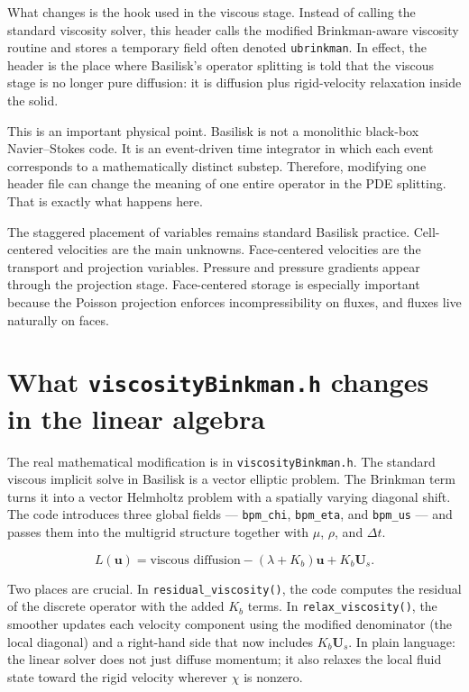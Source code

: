 \documentclass[11pt,a4paper]{article}
\begin{document}
What changes is the hook used in the viscous stage. Instead of calling the standard viscosity solver, this header calls the modified Brinkman-aware viscosity routine and stores a temporary field often denoted \texttt{ubrinkman}. In effect, the header is the place where Basilisk's operator splitting is told that the viscous stage is no longer pure diffusion: it is diffusion plus rigid-velocity relaxation inside the solid.

This is an important physical point. Basilisk is not a monolithic black-box Navier--Stokes code. It is an event-driven time integrator in which each event corresponds to a mathematically distinct substep. Therefore, modifying one header file can change the meaning of one entire operator in the PDE splitting. That is exactly what happens here.

The staggered placement of variables remains standard Basilisk practice. Cell-centered velocities are the main unknowns. Face-centered velocities are the transport and projection variables. Pressure and pressure gradients appear through the projection stage. Face-centered storage is especially important because the Poisson projection enforces incompressibility on fluxes, and fluxes live naturally on faces.

\section{What \texttt{viscosityBinkman.h} changes in the linear algebra}

The real mathematical modification is in \texttt{viscosityBinkman.h}. The standard viscous implicit solve in Basilisk is a vector elliptic problem. The Brinkman term turns it into a vector Helmholtz problem with a spatially varying diagonal shift. The code introduces three global fields --- \texttt{bpm\_chi}, \texttt{bpm\_eta}, and \texttt{bpm\_us} --- and passes them into the multigrid structure together with $\mu$, $\rho$, and $\Delta t$.

\begin{equation}
L(\bm{u}) = \text{viscous diffusion} - (\lambda + K_b)\bm{u} + K_b\bm{U}_s.
\end{equation}

Two places are crucial. In \texttt{residual\_viscosity()}, the code computes the residual of the discrete operator with the added $K_b$ terms. In \texttt{relax\_viscosity()}, the smoother updates each velocity component using the modified denominator (the local diagonal) and a right-hand side that now includes $K_b\bm{U}_s$. In plain language: the linear solver does not just diffuse momentum; it also relaxes the local fluid state toward the rigid velocity wherever $\chi$ is nonzero.
\end{document}
